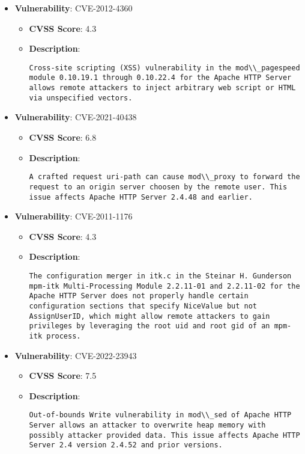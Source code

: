 \documentclass{article}
\begin{document}
\begin{itemize}
        \item \textbf{Vulnerability}: CVE-2012-4360
        \begin{itemize}
            \item \textbf{CVSS Score}:  4.3 
            \item \textbf{Description}:
            \parbox[t]{0.9\linewidth}{
                \verb|Cross-site scripting (XSS) vulnerability in the mod\\_pagespeed module 0.10.19.1 through 0.10.22.4 for the Apache HTTP Server allows remote attackers to inject arbitrary web script or HTML via unspecified vectors.|
            }
        \end{itemize}
    
        \item \textbf{Vulnerability}: CVE-2021-40438
        \begin{itemize}
            \item \textbf{CVSS Score}:  6.8 
            \item \textbf{Description}:
            \parbox[t]{0.9\linewidth}{
                \verb|A crafted request uri-path can cause mod\\_proxy to forward the request to an origin server choosen by the remote user. This issue affects Apache HTTP Server 2.4.48 and earlier.|
            }
        \end{itemize}
    
        \item \textbf{Vulnerability}: CVE-2011-1176
        \begin{itemize}
            \item \textbf{CVSS Score}:  4.3 
            \item \textbf{Description}:
            \parbox[t]{0.9\linewidth}{
                \verb|The configuration merger in itk.c in the Steinar H. Gunderson mpm-itk Multi-Processing Module 2.2.11-01 and 2.2.11-02 for the Apache HTTP Server does not properly handle certain configuration sections that specify NiceValue but not AssignUserID, which might allow remote attackers to gain privileges by leveraging the root uid and root gid of an mpm-itk process.|
            }
        \end{itemize}
    
        \item \textbf{Vulnerability}: CVE-2022-23943
        \begin{itemize}
            \item \textbf{CVSS Score}:  7.5 
            \item \textbf{Description}:
            \parbox[t]{0.9\linewidth}{
                \verb|Out-of-bounds Write vulnerability in mod\\_sed of Apache HTTP Server allows an attacker to overwrite heap memory with possibly attacker provided data. This issue affects Apache HTTP Server 2.4 version 2.4.52 and prior versions.|
            }
        \end{itemize}
    

\end{itemize}
\end{document}
